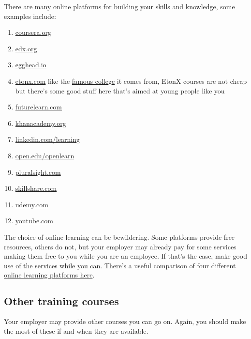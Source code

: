 \documentclass[
]{book}
\providecommand{\tightlist}{%
  \setlength{\itemsep}{0pt}\setlength{\parskip}{0pt}}
\begin{document}
There are many online platforms for building your skills and knowledge, some examples include:

\begin{enumerate}
\def\labelenumi{\arabic{enumi}.}
\tightlist
\item
  \href{https://www.coursera.org}{coursera.org}
\item
  \href{https://www.edx.org}{edx.org}
\item
  \href{https://egghead.io}{egghead.io}
\item
  \href{https://etonx.com}{etonx.com} like the \href{https://en.wikipedia.org/wiki/Eton_College}{famous college} it comes from, EtonX courses are not cheap but there's some good stuff here that's aimed at young people like you
\item
  \href{https://www.futurelearn.com}{futurelearn.com}
\item
  \href{https://www.khanacademy.org}{khanacademy.org}
\item
  \href{https://www.linkedin.com/learning}{linkedin.com/learning}
\item
  \href{https://www.open.edu/openlearn}{open.edu/openlearn}
\item
  \href{https://www.pluralsight.com}{pluralsight.com}
\item
  \href{https://www.skillshare.com}{skillshare.com}
\item
  \href{https://www.udemy.com}{udemy.com}
\item
  \href{https://www.youtube.com}{youtube.com}
\end{enumerate}

The choice of online learning can be bewildering. Some platforms provide free resources, others do not, but your employer may already pay for some services making them free to you while you are an employee. If that's the case, make good use of the services while you can. There's a \href{https://www.businessinsider.com/online-learning-platform-comparison-udemy-skillshare-lynda-coursera}{useful comparison of four different online learning platforms here}. \citep{udemy}

\hypertarget{othertrain}{%
\subsection{Other training courses}\label{othertrain}}

Your employer may provide other courses you can go on. Again, you should make the most of these if and when they are available.
\end{document}
